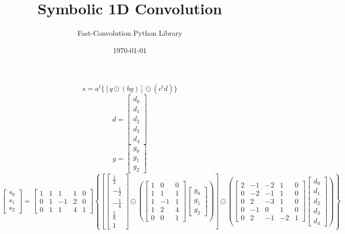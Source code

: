 \documentclass{article}%
\title{Symbolic 1D Convolution}%
\author{Fast{-}Convolution Python Library}%
\date{\today}%
\begin{document}
%
\normalsize%
\maketitle%
\[%
s = a^t \{[q \odot (bg)] \odot (c^t d)\}%
\]%
\[%
d = \left[\begin{matrix}d_{0}\\d_{1}\\d_{2}\\d_{3}\\d_{4}\end{matrix}\right]%
\]%
\[%
g = \left[\begin{matrix}g_{0}\\g_{1}\\g_{2}\end{matrix}\right]%
\]%
\[%
\left[\begin{matrix}s_{0}\\s_{1}\\s_{2}\end{matrix}\right] = \left[\begin{matrix}1 & 1 & 1 & 1 & 0\\0 & 1 & -1 & 2 & 0\\0 & 1 & 1 & 4 & 1\end{matrix}\right] \left\{ \left[ \left[\begin{matrix}\frac{1}{2}\\- \frac{1}{2}\\- \frac{1}{6}\\\frac{1}{6}\\1\end{matrix}\right] \odot \left( \left[\begin{matrix}1 & 0 & 0\\1 & 1 & 1\\1 & -1 & 1\\1 & 2 & 4\\0 & 0 & 1\end{matrix}\right] \left[\begin{matrix}g_{0}\\g_{1}\\g_{2}\end{matrix}\right] \right) \right] \odot \left( \left[\begin{matrix}2 & -1 & -2 & 1 & 0\\0 & -2 & -1 & 1 & 0\\0 & 2 & -3 & 1 & 0\\0 & -1 & 0 & 1 & 0\\0 & 2 & -1 & -2 & 1\end{matrix}\right] \left[\begin{matrix}d_{0}\\d_{1}\\d_{2}\\d_{3}\\d_{4}\end{matrix}\right] \right) \right\}%
\]%
\end{document}
